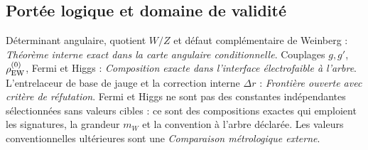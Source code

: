 \subsection*{Portée logique et domaine de validité}
Déterminant angulaire, quotient \(W/Z\) et défaut complémentaire de Weinberg :
\emph{Théorème interne exact dans la carte angulaire conditionnelle}. Couplages \(g,g'\),
\(\rho_{\rm EW}^{(0)}\), Fermi et Higgs : \emph{Composition exacte dans
l'interface électrofaible à l'arbre}. L'entrelaceur de base de jauge et la
correction interne \(\Delta r\) : \emph{Frontière ouverte avec critère de réfutation}.
Fermi et Higgs ne sont pas des constantes indépendantes sélectionnées sans valeurs
cibles : ce sont des compositions exactes qui emploient les signatures, la grandeur
\(m_W\) et la
convention à l'arbre déclarée. Les valeurs conventionnelles ultérieures
sont une \emph{Comparaison métrologique externe}.

